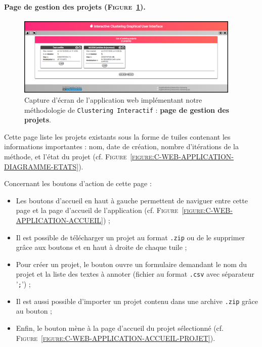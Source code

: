 		
		\paragraph{Page de gestion des projets (\textsc{Figure~\ref{figure:C-WEB-APPLICATION-LISTE-PROJETS}}).}
			
			\begin{figure}[H]
				\centering
				\includegraphics[width=0.95\textwidth]{figures/interactive-clustering-application-liste-projets}
				\caption{
					Capture d'écran de l'application web implémentant notre méthodologie de \texttt{Clustering Interactif} : \textbf{page de gestion des projets}.
				}
				\label{figure:C-WEB-APPLICATION-LISTE-PROJETS}
			\end{figure}
			
			Cette page liste les projets existants sous la forme de tuiles contenant les informations importantes : nom, date de création, nombre d'itérations de la méthode, et l'état du projet (cf. \textsc{Figure~\ref{figure:C-WEB-APPLICATION-DIAGRAMME-ETATS}}).
			
			Concernant les boutons d'action de cette page :
			\begin{itemize}
				\item Les boutons d'accueil en haut à gauche permettent de naviguer entre cette page et la page d'accueil de l'application (cf. \textsc{Figure~\ref{figure:C-WEB-APPLICATION-ACCUEIL}}) ;
				\item Il est possible de télécharger un projet au format \texttt{.zip} ou de le supprimer grâce aux boutons \textguillemets{\faDownload} et \textguillemets{\faTrash} en haut à droite de chaque tuile ;
				\item Pour créer un projet, le bouton  ouvre un formulaire demandant le nom du projet et la liste des textes à annoter (fichier au format \texttt{.csv} avec séparateur '\texttt{;}') ;
				\item Il est aussi possible d'importer un projet contenu dans une archive \texttt{.zip} grâce au bouton  ;
				\item Enfin, le bouton  mène à la page d'accueil du projet sélectionné (cf. \textsc{Figure~\ref{figure:C-WEB-APPLICATION-ACCUEIL-PROJET}}).
			\end{itemize}
	

